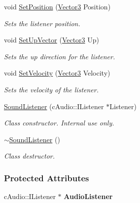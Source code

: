 \begin{DoxyCompactItemize}
void \hyperlink{classphys_1_1SoundListener_ab2a679aaf18c646365285c8691ffcb0c}{SetPosition} (\hyperlink{classphys_1_1Vector3}{Vector3} Position)
\begin{DoxyCompactList}\small\item\em Sets the listener position. \item\end{DoxyCompactList}\item 
void \hyperlink{classphys_1_1SoundListener_a51d6f4ccbbbe059e330eba6ef218eda8}{SetUpVector} (\hyperlink{classphys_1_1Vector3}{Vector3} Up)
\begin{DoxyCompactList}\small\item\em Sets the up direction for the listener. \item\end{DoxyCompactList}\item 
void \hyperlink{classphys_1_1SoundListener_a22e63d58ca9710f9a54fb08dbd9be4d9}{SetVelocity} (\hyperlink{classphys_1_1Vector3}{Vector3} Velocity)
\begin{DoxyCompactList}\small\item\em Sets the velocity of the listener. \item\end{DoxyCompactList}\item 
\hyperlink{classphys_1_1SoundListener_ab4063bdd8b0bc654a416915354ed0312}{SoundListener} (cAudio::IListener $\ast$Listener)
\begin{DoxyCompactList}\small\item\em Class constructor. Internal use only. \item\end{DoxyCompactList}\item 
\hyperlink{classphys_1_1SoundListener_ab32dd020228ca0e09271f988d3a2e7f9}{$\sim$SoundListener} ()
\begin{DoxyCompactList}\small\item\em Class destructor. \item\end{DoxyCompactList}\end{DoxyCompactItemize}
\subsubsection*{Protected Attributes}
\begin{DoxyCompactItemize}
\item 
\hypertarget{classphys_1_1SoundListener_ada88acce2006736a00c8eb3a428a3e42}{
cAudio::IListener $\ast$ {\bfseries AudioListener}}
\label{classphys_1_1SoundListener_ada88acce2006736a00c8eb3a428a3e42}

\end{DoxyCompactItemize}


